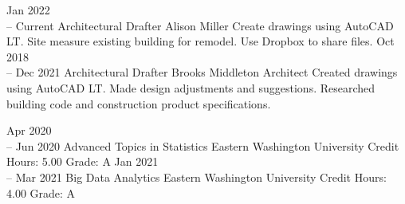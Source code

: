 \documentclass[11pt]{developercv} %
\newcommand{\vsp}{\vspace{-10pt}}
\begin{document}
\vsp



\begin{entrylist}
	\entry
		{Jan 2022 \\
		-- Current}
		{Architectural Drafter}
		{Alison Miller}
		{Create drawings using AutoCAD LT. Site measure existing building for remodel. Use Dropbox to share files.}
	\entry
		{Oct 2018 \\
		-- Dec 2021}
		{Architectural Drafter}
		{Brooks Middleton Architect}
		{Created drawings using AutoCAD LT. Made design adjustments and suggestions. Researched building code and construction product specifications.}
\end{entrylist}

\vsp



\begin{entrylist}
	\entry
		{Apr 2020 \\
		-- Jun 2020}
		{Advanced Topics in Statistics}
		{Eastern Washington University}
		{Credit Hours: 5.00 \hspace{100pt} Grade: A}
	\entry
		{Jan 2021 \\
		-- Mar 2021}
		{Big Data Analytics}
		{Eastern Washington University}
		{Credit Hours: 4.00 \hspace{100pt} Grade: A}
\end{entrylist}
\end{document}
